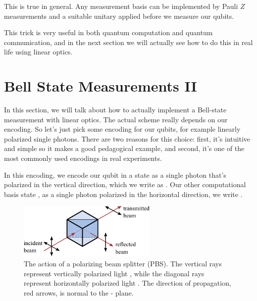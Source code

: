 This is true in general. Any measurement basis can be implemented by Pauli $Z$ measurements and a suitable unitary applied before we measure our qubits.

This trick is very useful in both quantum computation and quantum communication, and in the next section we will actually see how to do this in real life using linear optics.



\section{Bell State Measurements II}
\label{sec:13-3_Bell_state_measurement_2}

In this section, we will talk about how to actually implement a Bell-state measurement with linear optics. The actual scheme really depends on our encoding. So let's just pick some encoding for our qubits, for example linearly polarized single photons. There are two reasons for this choice: first, it's intuitive and simple so it makes a good pedagogical example, and second, it's one of the most commonly used encodings in real experiments.

In this encoding, we encode our qubit in a state  as a single photon that's polarized in the vertical direction, which we write as . Our other computational basis state , as a single photon polarized in the horizontal direction, we write .

\begin{figure}[t]
    \centering
    \includegraphics[width=0.6\textwidth]{lesson13/13-3_PBS.pdf}
    \caption[A polarizing beam splitter (PBS)]{The action of a polarizing beam splitter (PBS).  The vertical rays represent vertically polarized light , while the diagonal rays represent horizontally polarized light .  The direction of propagation, red arrows, is normal to the - plane.}
    \label{fig:13-PBS}
\end{figure}




